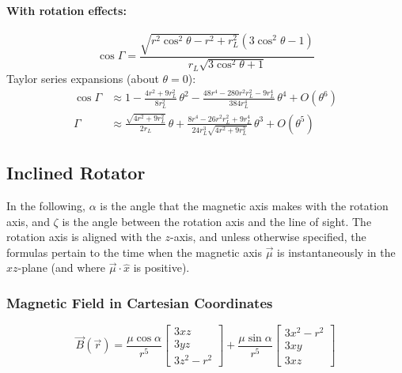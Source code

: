 \documentclass{article}
\begin{document}
\paragraph{With rotation effects:}
\begin{equation}
    \cos\Gamma = \frac{\sqrt{r^2\cos^2\theta-r^2+r_L^2}(3\cos^2\theta-1)}{r_L\sqrt{3\cos^2\theta+1}}
\end{equation}
Taylor series expansions (about $\theta = 0$):
\begin{equation}
    \begin{aligned}
        \cos\Gamma &\approx 1 - \frac{4r^2+9r_L^2}{8r_L^2}\,\theta^2 -
                            \frac{48r^4 - 280r^2r_L^2 - 9r_L^4}{384r_L^4}\,\theta^4 + O(\theta^6) \\
        \Gamma &\approx \frac{\sqrt{4r^2+9r_L^2}}{2r_L}\,\theta +
                        \frac{8r^4 - 26r^2r_L^2 + 9r_L^4}{24r_L^3\sqrt{4r^2+9r_L^2}}\,\theta^3 + O(\theta^5)
    \end{aligned}
\end{equation}

\subsection{Inclined Rotator}

In the following, $\alpha$ is the angle that the magnetic axis makes with the rotation axis, and $\zeta$ is the angle between the rotation axis and the line of sight.
The rotation axis is aligned with the $z$-axis, and unless otherwise specified, the formulas pertain to the time when the magnetic axis $\vec{\mu}$ is instantaneously in the $xz$-plane (and where $\vec{\mu}\cdot\hat{x}$ is positive).

\subsubsection{Magnetic Field in Cartesian Coordinates}

\begin{equation}
    \vec{B}(\vec{r}) =
    \frac{\mu\cos\alpha}{r^5}\begin{bmatrix}
        3xz \\
        3yz \\
        3z^2 - r^2
    \end{bmatrix} + 
    \frac{\mu\sin\alpha}{r^5}\begin{bmatrix}
        3x^2 - r^2 \\
        3xy \\
        3xz
    \end{bmatrix}
\end{equation}
\end{document}
